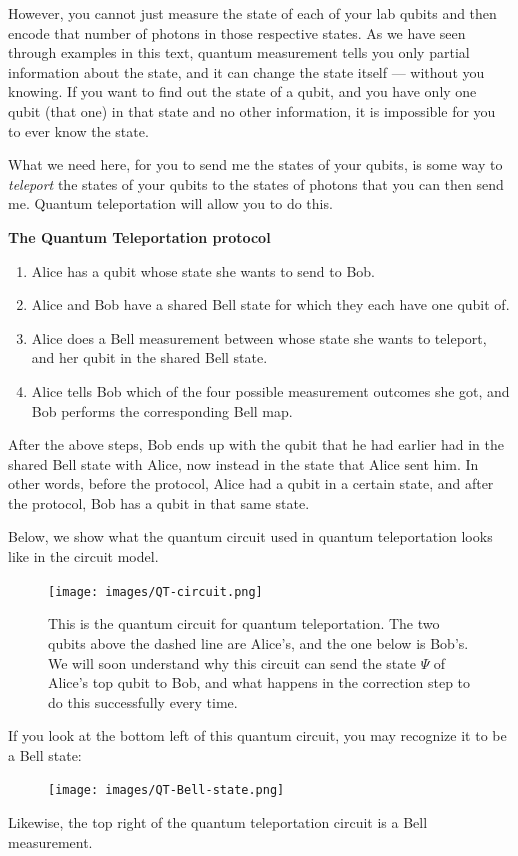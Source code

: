 \documentclass{article}
\theoremstyle{definition}
\begin{document}
However, you cannot just measure the state of each of your lab qubits and then encode that number of photons in those respective states.
As we have seen through examples in this text, quantum measurement tells you only partial information about the state, and it can change the state itself --- without you knowing.
If you want to find out the state of a qubit, and you have only one qubit (that one) in that state and no other information, it is impossible for you to ever know the state.

What we need here, for you to send me the states of your qubits, is some way to \emph{teleport} the states of your qubits to the states of photons that you can then send me.
Quantum teleportation will allow you to do this.

\textbf{The Quantum Teleportation protocol}
\begin{enumerate}
	\item Alice has a qubit whose state she wants to send to Bob.
	\item Alice and Bob have a shared Bell state for which they each have one qubit of.
	\item Alice does a Bell measurement between whose state she wants to teleport, and her qubit in the shared Bell state.
	\item Alice tells Bob which of the four possible measurement outcomes she got, and Bob performs the corresponding Bell map.
\end{enumerate}
After the above steps, Bob ends up with the qubit that he had earlier had in the shared Bell state with Alice, now instead in the state that Alice sent him.
In other words, before the protocol, Alice had a qubit in a certain state, and after the protocol, Bob has a qubit in that same state.

Below, we show what the quantum circuit used in quantum teleportation looks like in the circuit model.
\begin{figure}[H]
	\centering
	\texttt{[image: images/QT-circuit.png]}
	\caption{This is the quantum circuit for quantum teleportation.  The two qubits above the dashed line are Alice's, and the one below is Bob's.  We will soon understand why this circuit can send the state $\Psi$ of Alice's top qubit to Bob, and what happens in the correction step to do this successfully every time.}
\end{figure}

If you look at the bottom left of this quantum circuit, you may recognize it to be a Bell state:
\begin{figure}[H]
	\centering
	\texttt{[image: images/QT-Bell-state.png]}
\end{figure}
Likewise, the top right of the quantum teleportation circuit is a Bell measurement.
\end{document}
